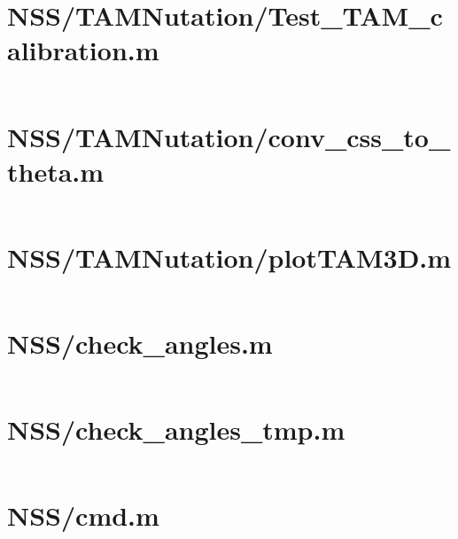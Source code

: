 \pagebreak
\section*{NSS/TAMNutation/Test\_TAM\_calibration.m}\label{code:NSS/TAMNutation/Test_TAM_calibration.m}
\inputminted[linenos,fontsize=\scriptsize]{matlab}{/home/dcouture/git/mathyourlife/TSatPy/beta_versions/matlab_object_oriented/TAMNutation/Test_TAM_calibration.m}

\pagebreak
\section*{NSS/TAMNutation/conv\_css\_to\_theta.m}\label{code:NSS/TAMNutation/conv_css_to_theta.m}
\inputminted[linenos,fontsize=\scriptsize]{matlab}{/home/dcouture/git/mathyourlife/TSatPy/beta_versions/matlab_object_oriented/TAMNutation/conv_css_to_theta.m}

\pagebreak
\section*{NSS/TAMNutation/plotTAM3D.m}\label{code:NSS/TAMNutation/plotTAM3D.m}
\inputminted[linenos,fontsize=\scriptsize]{matlab}{/home/dcouture/git/mathyourlife/TSatPy/beta_versions/matlab_object_oriented/TAMNutation/plotTAM3D.m}

\pagebreak
\section*{NSS/check\_angles.m}\label{code:NSS/check_angles.m}
\inputminted[linenos,fontsize=\scriptsize]{matlab}{/home/dcouture/git/mathyourlife/TSatPy/beta_versions/matlab_object_oriented/check_angles.m}

\pagebreak
\section*{NSS/check\_angles\_tmp.m}\label{code:NSS/check_angles_tmp.m}
\inputminted[linenos,fontsize=\scriptsize]{matlab}{/home/dcouture/git/mathyourlife/TSatPy/beta_versions/matlab_object_oriented/check_angles_tmp.m}

\pagebreak
\section*{NSS/cmd.m}\label{code:NSS/cmd.m}
\inputminted[linenos,fontsize=\scriptsize]{matlab}{/home/dcouture/git/mathyourlife/TSatPy/beta_versions/matlab_object_oriented/cmd.m}


